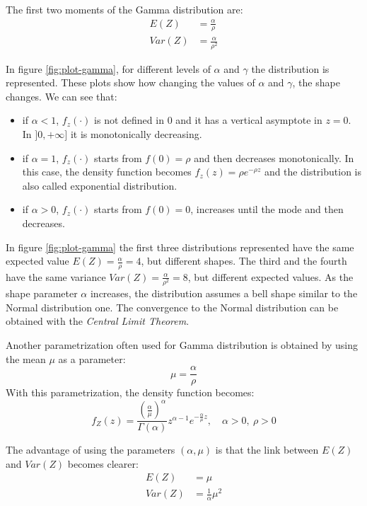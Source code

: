 \documentclass[a4paper, twoside, openright, 12pt]{report}
\providecommand{\tightlist}{%
  \setlength{\itemsep}{0pt}\setlength{\parskip}{0pt}}
\theoremstyle{definition}
\theoremstyle{definition}
\theoremstyle{definition}
\theoremstyle{remark}
\begin{document}
The first two moments of the Gamma distribution are:
\begin{align*}
E(Z)   & = \frac{\alpha}{\rho} \\
Var(Z) & = \frac{\alpha}{\rho^2}
\end{align*}

In figure \ref{fig:plot-gamma}, for different levels of \(\alpha\) and \(\gamma\) the distribution is represented. These plots show how changing the values of \(\alpha\) and \(\gamma\), the shape changes. We can see that:

\begin{itemize}
\tightlist
\item
  if \(\alpha < 1\), \(f_z(\cdot)\) is not defined in \(0\) and it has a vertical asymptote in \(z = 0\). In \(]0, +\infty]\) it is monotonically decreasing.
\item
  if \(\alpha = 1\), \(f_z(\cdot)\) starts from \(f(0) = \rho\) and then decreases monotonically. In this case, the density function becomes \(f_z(z) = \rho e^{-\rho z}\) and the distribution is also called exponential distribution.
\item
  if \(\alpha > 0\), \(f_z(\cdot)\) starts from \(f(0) = 0\), increases until the mode and then decreases.
\end{itemize}

In figure \ref{fig:plot-gamma} the first three distributions represented have the same expected value \(E(Z)=\frac{\alpha}{\rho} = 4\), but different shapes. The third and the fourth have the same variance \(Var(Z) = \frac{\alpha}{\rho^2} = 8\), but different expected values. As the shape parameter \(\alpha\) increases, the distribution assumes a bell shape similar to the Normal distribution one. The convergence to the Normal distribution can be obtained with the \emph{Central Limit Theorem}.

Another parametrization often used for Gamma distribution is obtained by using the mean \(\mu\) as a parameter:
\[
\mu = \frac{\alpha}{\rho}
\]
With this parametrization, the density function becomes:
\[
f_Z(z) = \frac{\left(\frac{\alpha}{\mu}\right)^\alpha}{\Gamma(\alpha)}z^{\alpha-1}e^{-\frac{\alpha}{\mu} z}, \quad \alpha > 0, \ \rho > 0
\]

The advantage of using the parameters \((\alpha, \mu)\) is that the link between \(E(Z)\) and \(Var(Z)\) becomes clearer:
\begin{align*}
E(Z)   & = \mu \\
Var(Z) & = \frac{1}{\alpha}\mu^2
\end{align*}
\end{document}
